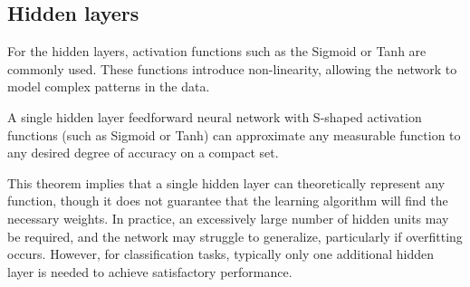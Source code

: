 \subsection{Hidden layers}
For the hidden layers, activation functions such as the Sigmoid or Tanh are commonly used. 
These functions introduce non-linearity, allowing the network to model complex patterns in the data.
\begin{theorem}
    A single hidden layer feedforward neural network with S-shaped activation functions (such as Sigmoid or Tanh) can approximate any measurable function to any desired degree of accuracy on a compact set.
\end{theorem}
This theorem implies that a single hidden layer can theoretically represent any function, though it does not guarantee that the learning algorithm will find the necessary weights. 
In practice, an excessively large number of hidden units may be required, and the network may struggle to generalize, particularly if overfitting occurs. 
However, for classification tasks, typically only one additional hidden layer is needed to achieve satisfactory performance.